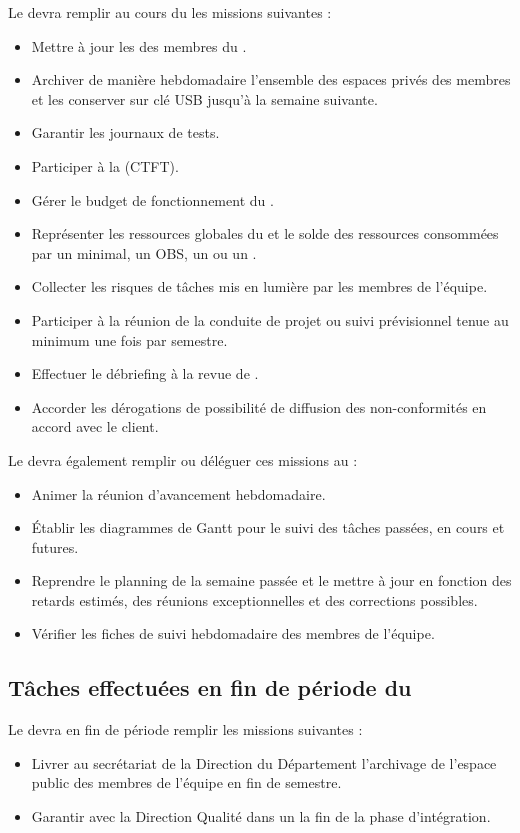 Le \CP{} devra remplir au cours du \PICCourt les missions suivantes :

\begin{itemize}
	\item Mettre à jour les \FC{} des membres du \PICCourt.
	\item Archiver de manière hebdomadaire l’ensemble des espaces privés des membres et les conserver sur clé USB jusqu’à la semaine suivante.
	\item Garantir les journaux de tests.
	\item Participer à la \CTFT (CTFT).
	\item Gérer le budget de fonctionnement du \PICCourt.
	\item Représenter les ressources globales du \PICCourt et le solde des ressources consommées par un \WBSCourt minimal, un OBS, un \RBSCourt{} ou un \FBSCourt.
	\item Collecter les risques de tâches mis en lumière par les membres de l’équipe.
	\item Participer à la réunion de la conduite de projet ou suivi prévisionnel tenue au minimum une fois par semestre.
	\item Effectuer le débriefing à la revue de \PICCourt.
	\item Accorder les dérogations de possibilité de diffusion des non-conformités en accord avec le client.
\end{itemize}

Le \CP{} devra également remplir ou déléguer ces missions au \CPA :
\begin{itemize}
	\item Animer la réunion d’avancement hebdomadaire.
	\item Établir les diagrammes de Gantt pour le suivi des tâches passées, en cours et futures.
	\item Reprendre le planning de la semaine passée et le mettre à jour en fonction des retards estimés, des réunions exceptionnelles et des corrections possibles.
	\item Vérifier les fiches de suivi hebdomadaire des membres de l’équipe.
\end{itemize}

\subsection*{Tâches effectuées en fin de période du \PICCourt}

Le \CP{} devra en fin de période remplir les missions suivantes :
\begin{itemize}
	\item Livrer au secrétariat de la Direction du Département \ASICourt{} l’archivage de l’espace public des membres de l’équipe en fin de semestre.
	\item Garantir avec la Direction Qualité dans un \PVCourt{} la fin de la phase d’intégration.
\end{itemize}
\newpage

